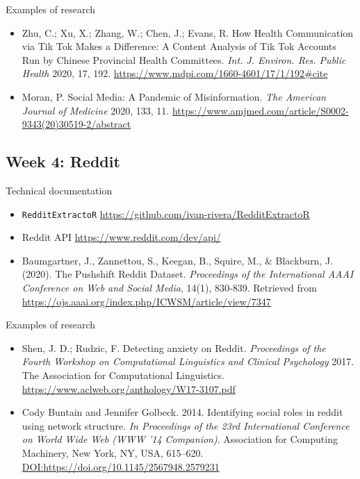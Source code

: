 \documentclass[11pt,]{article}
\providecommand{\tightlist}{%
  \setlength{\itemsep}{0pt}\setlength{\parskip}{0pt}}
\begin{document}
Examples of research

\begin{itemize}
\tightlist
\item
  Zhu, C.; Xu, X.; Zhang, W.; Chen, J.; Evans, R. How Health
  Communication via Tik Tok Makes a Difference: A Content Analysis of
  Tik Tok Accounts Run by Chinese Provincial Health Committees.
  \emph{Int. J. Environ. Res. Public Health} 2020, 17, 192.
  \url{https://www.mdpi.com/1660-4601/17/1/192\#cite}
\item
  Moran, P. Social Media: A Pandemic of Misinformation. \emph{The
  American Journal of Medicine} 2020, 133, 11.
  \url{https://www.amjmed.com/article/S0002-9343(20)30519-2/abstract}
\end{itemize}

\hypertarget{week-4-reddit}{%
\subsection{Week 4: Reddit}\label{week-4-reddit}}

Technical documentation

\begin{itemize}
\tightlist
\item
  \texttt{RedditExtractoR}
  \url{https://github.com/ivan-rivera/RedditExtractoR}
\item
  Reddit API \url{https://www.reddit.com/dev/api/}
\item
  Baumgartner, J., Zannettou, S., Keegan, B., Squire, M., \& Blackburn,
  J. (2020). The Pushshift Reddit Dataset. \emph{Proceedings of the
  International AAAI Conference on Web and Social Media}, 14(1),
  830-839. Retrieved from
  \url{https://ojs.aaai.org/index.php/ICWSM/article/view/7347}
\end{itemize}

Examples of research

\begin{itemize}
\tightlist
\item
  Shen, J. D.; Rudzic, F. Detecting anxiety on Reddit. \emph{Proceedings
  of the Fourth Workshop on Computational Linguistics and Clinical
  Psychology} 2017. The Association for Computational Linguistics.
  \url{https://www.aclweb.org/anthology/W17-3107.pdf}
\item
  Cody Buntain and Jennifer Golbeck. 2014. Identifying social roles in
  reddit using network structure. \emph{In Proceedings of the 23rd
  International Conference on World Wide Web (WWW '14 Companion)}.
  Association for Computing Machinery, New York, NY, USA, 615--620.
  \url{DOI:https://doi.org/10.1145/2567948.2579231}
\end{itemize}
\end{document}
